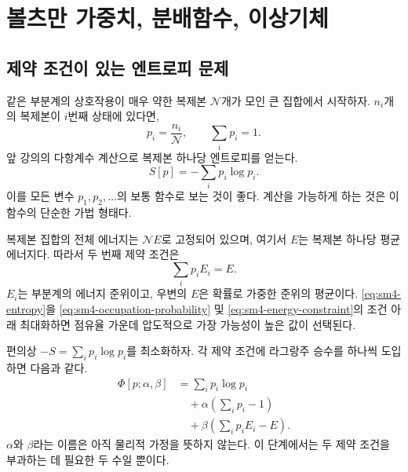 \chapter{볼츠만 가중치, 분배함수, 이상기체}


\section{제약 조건이 있는 엔트로피 문제}

같은 부분계의 상호작용이 매우 약한 복제본 \(\mathcal N\)개가 모인 큰 집합에서 시작하자. \(n_i\)개의 복제본이 \(i\)번째 상태에 있다면, \begin{equation}
 p_i=\frac{n_i}{\mathcal N},
 \qquad
 \sum_i p_i=1.
 \label{eq:sm4-occupation-probability}
\end{equation}앞 강의의 다항계수 계산으로 복제본 하나당 엔트로피를 얻는다. \begin{equation}
 S[p]=-\sum_i p_i\log p_i.
 \label{eq:sm4-entropy}
\end{equation}이를 모든 변수 \(p_1,p_2,\ldots\)의 보통 함수로 보는 것이 좋다. 계산을 가능하게 하는 것은 이 함수의 단순한 가법 형태다.

복제본 집합의 전체 에너지는 \(\mathcal N E\)로 고정되어 있으며, 여기서 \(E\)는 복제본 하나당 평균 에너지다. 따라서 두 번째 제약 조건은 \begin{equation}
 \sum_i p_iE_i=E.
 \label{eq:sm4-energy-constraint}
\end{equation}\(E_i\)는 부분계의 에너지 준위이고, 우변의 \(E\)은 확률로 가중한 준위의 평균이다. \eqref{eq:sm4-entropy}을 \eqref{eq:sm4-occupation-probability} 및 \eqref{eq:sm4-energy-constraint}의 조건 아래 최대화하면 점유율 가운데 압도적으로 가장 가능성이 높은 값이 선택된다.

편의상 \(-S=\sum_i p_i\log p_i\)를 최소화하자. 각 제약 조건에 라그랑주 승수를 하나씩 도입하면 다음과 같다. \begin{equation}
 \begin{aligned}
 \Phi[p;\alpha,\beta]
 &=\sum_i p_i\log p_i\\
 &\quad+\alpha\left(\sum_i p_i-1\right)\\
 &\quad+\beta\left(\sum_i p_iE_i-E\right).
 \end{aligned}
 \label{eq:sm4-augmented-functional}
\end{equation}\(\alpha\)와 \(\beta\)라는 이름은 아직 물리적 가정을 뜻하지 않는다. 이 단계에서는 두 제약 조건을 부과하는 데 필요한 두 수일 뿐이다.

